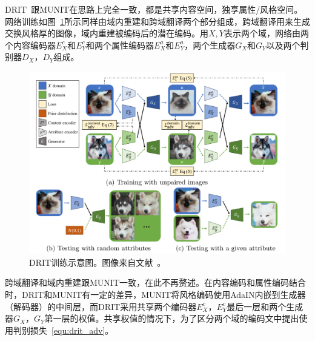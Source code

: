 

DRIT~\cite{lee2018diverse}跟MUNIT在思路上完全一致，都是共享内容空间，独享属性/风格空间。网络训练如图~\ref{fig:drit}所示同样由域内重建和跨域翻译两个部分组成，跨域翻译用来生成交换风格厚的图像，域内重建被编码后的潜在编码。用$X, Y$表示两个域，网络由两个内容编码器$E_{X}^{c}$和$E_{Y}^{c}$和两个属性编码器$E_{X}^{a}$和$E_{Y}^{a}$，两个生成器$G_X$和$G_Y$以及两个判别器$D_X$，$D_Y$组成。

\begin{figure}[ht]
    \centering
	\includegraphics[width=\textwidth]{figures/DRIT.pdf}
	\caption{DRIT训练示意图。图像来自文献~\cite{lee2018diverse}。}
	\label{fig:drit}
\end{figure}

跨域翻译和域内重建跟MUNIT一致，在此不再赘述。在内容编码和属性编码结合时，DRIT和MUNIT有一定的差异，MUNIT将风格编码使用AdaIN内嵌到生成器（解码器）的中间层，而DRIT采用共享两个编码器$E_X^c$，$E_Y^c$最后一层和两个生成器$G_X$，$G_Y$第一层的权值。共享权值的情况下，为了区分两个域的编码文中提出使用判别损失~\ref{equ:drit_adv}。

